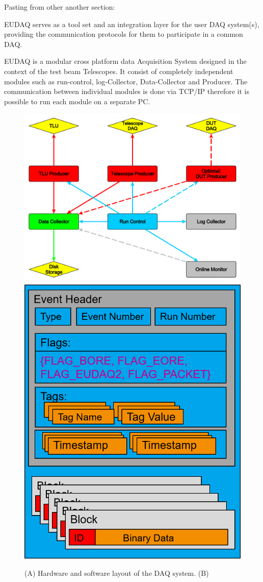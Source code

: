 
Pasting  from other another section:

EUDAQ serves as a tool set and an integration layer for the user DAQ system(s), providing the communication protocols for them to participate in a common DAQ. 

EUDAQ is a modular cross platform data Acquisition System designed in the context of the \eudet test beam Telescopes. 
It consist of completely independent modules such as run-control, log-Collector, Data-Collector and Producer. 
The communication between individual modules is done via TCP/IP therefore it is possible to run each module on a separate PC. 


\begin{figure}[tb]
	\center
	\includegraphics[width=.55\textwidth]{figures/eudaq}
	\includegraphics[width=.38\textwidth]{figures/rawdataevent.png}
	\caption[DAQ_System]{(A) Hardware and software layout of the DAQ system. (B) \rawdataevent}
	\label{fig:todo}
\end{figure}

% 	



